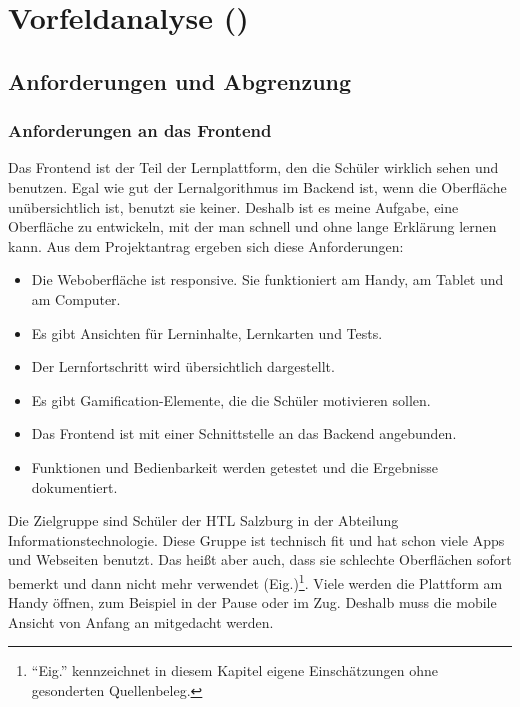  
\chapter{Vorfeldanalyse (\Jakob)}
\label{chap:vorfeld-berger}
 
\section{Anforderungen und Abgrenzung}
\label{sec:anforderungen-frontend}
 
\subsection{Anforderungen an das Frontend}
 

Das Frontend ist der Teil der Lernplattform, den die Schüler wirklich sehen und benutzen. Egal wie gut der Lernalgorithmus im Backend ist, wenn die Oberfläche unübersichtlich ist, benutzt sie keiner. Deshalb ist es meine Aufgabe, eine Oberfläche zu entwickeln, mit der man schnell und ohne lange Erklärung lernen kann. Aus dem Projektantrag ergeben sich diese Anforderungen:
 
\begin{itemize}
    \item Die Weboberfläche ist responsive. Sie funktioniert am Handy, am Tablet und am Computer.
    \item Es gibt Ansichten für Lerninhalte, Lernkarten und Tests.
    \item Der Lernfortschritt wird übersichtlich dargestellt.
    \item Es gibt Gamification-Elemente, die die Schüler motivieren sollen.
    \item Das Frontend ist mit einer Schnittstelle an das Backend angebunden.
    \item Funktionen und Bedienbarkeit werden getestet und die Ergebnisse dokumentiert.
\end{itemize}
 
Die Zielgruppe sind Schüler der HTL Salzburg in der Abteilung Informationstechnologie. Diese Gruppe ist technisch fit und hat schon viele Apps und Webseiten benutzt. Das heißt aber auch, dass sie schlechte Oberflächen sofort bemerkt und dann nicht mehr verwendet (Eig.)\footnote{\enquote{Eig.} kennzeichnet in diesem Kapitel eigene Einschätzungen ohne gesonderten Quellenbeleg.}. Viele werden die Plattform am Handy öffnen, zum Beispiel in der Pause oder im Zug. Deshalb muss die mobile Ansicht von Anfang an mitgedacht werden.
 
